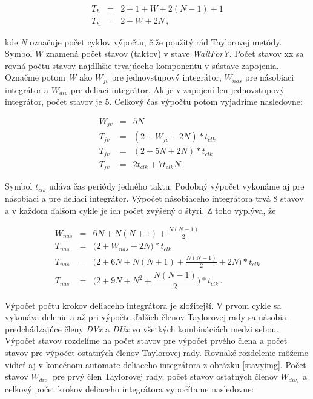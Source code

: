 \begin{eqnarray}
T_h & = & 2 + 1 + W + 2(N-1) + 1 \nonumber \\
T_h & = & 2 + W + 2N \, , \label{hkontrolerrovnica}
\end{eqnarray}

kde \textit{N} označuje počet cyklov výpočtu, čiže použitý rád Taylorovej metódy. Symbol $ W $ znamená počet stavov (taktov) v stave \textit{WaitForY}. Počet stavov xx sa rovná počtu stavov najdlhšie trvajúceho komponentu v sústave zapojenia. Označme potom \textit{W} ako $ W_{jv} $ pre jednovstupový integrátor, $ W_{nas} $ pre násobiaci integrátor a $ W_{div} $ pre deliaci integrátor.
Ak je v zapojení len jednovstupový integrátor, počet stavov je 5. Celkový čas výpočtu potom vyjadríme nasledovne:

\begin{eqnarray}
W_{jv} & = & 5N \nonumber \\ 
T_{jv} & = & (2 + W_{jv} + 2N)*t_{clk} \nonumber \\ 
T_{jv} & = & (2 + 5N + 2N)*t_{clk} \nonumber \\
T_{jv} & = & 2t_{clk} + 7t_{clk}N \, .
\end{eqnarray}

Symbol $ t_{clk} $ udáva čas periódy jedného taktu. Podobný výpočet vykonáme aj pre násobiaci a pre deliaci integrátor. Výpočet násobiaceho integrátora trvá 8 stavov a v každom ďalšom cykle je ich počet zvýšený o štyri. Z toho vyplýva, že

\begin{eqnarray}
W_{nas} & = & 6N + N(N+1) + \frac{N(N-1)}{2}  \nonumber \\
T_{nas} & = & \bigg(2 + W_{nas} + 2N\bigg)*t_{clk} \nonumber \\ 
T_{nas} & = & \bigg(2 + 6N + N(N+1) + \frac{N(N-1)}{2} + 2N\bigg)*t_{clk} \nonumber \\
T_{nas} & = & \bigg( 2 + 9N + N^2 + \dfrac{N(N-1)}{2}\bigg)*t_{clk} \, .
\end{eqnarray}
\bigskip

Výpočet počtu krokov deliaceho integrátora je zložitejší. V prvom cykle sa vykonáva delenie a až pri výpočte ďalších členov Taylorovej rady sa násobia predchádzajúce členy \textit{DVx} a \textit{DUx} vo všetkých kombináciách medzi sebou. Výpočet stavov rozdelíme na počet stavov pre výpočet prvého člena a počet stavov pre výpočet ostatných členov Taylorovej rady. Rovnaké rozdelenie môžeme vidieť aj v konečnom automate deliaceho integrátora z obrázku \ref{stavyimg}. Počet stavov $ W_{div_1} $ pre prvý člen Taylorovej rady, počet stavov ostatných členov $ W_{div_x} $ a celkový počet krokov deliaceho integrátora vypočítame nasledovne:


